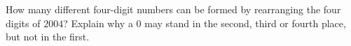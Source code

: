 How many different four-digit numbers can be formed by rearranging the four digits of $2004$? Explain why a $0$ may stand in the second, third or fourth place, but not in the first.
